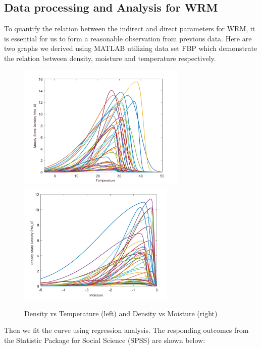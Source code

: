 \documentclass[12pt]{article}
\begin{document}
\subsection{Data processing and Analysis for WRM}
To quantify the relation between the indirect and direct parameters for WRM, it is essential for us to form a reasonable observation from previous data.
Here are two graphs we derived using MATLAB utilizing data set FBP which demonstrate the relation between density, moisture and temperature respectively. 
\begin{figure}[!htbp]
	\small
	\centering
	\includegraphics[width=8cm]{./pictures/temp.png}
	\includegraphics[width=7.5cm]{./pictures/moisture.png}
	\caption{Density vs Temperature (left) and Density vs Moisture (right)}\label{nt}
\end{figure}

Then we fit the curve using regression analysis. The responding outcomes from the Statistic Package for Social Science (SPSS) are shown below:
\end{document}
